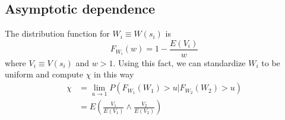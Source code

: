 \subsection{Asymptotic dependence}

The distribution function for $W_i\equiv W(s_i)$ is
\[ F_{W_i}(w) = 1 - \frac{E(V_i)}{w} \]
where $V_i\equiv V(s_i)$ and $w>1$. Using this fact, we can standardize $W_i$ to be uniform and compute $\chi$ in this way
\begin{align*}
\chi &= \lim_{u\rightarrow 1} P(F_{W_1}(W_1) > u | F_{W_2}(W_2) > u) \\
&= E\left(\frac{V_1}{E(V_1)} \wedge \frac{V_2}{E(V_2)}\right) \\
\end{align*}

